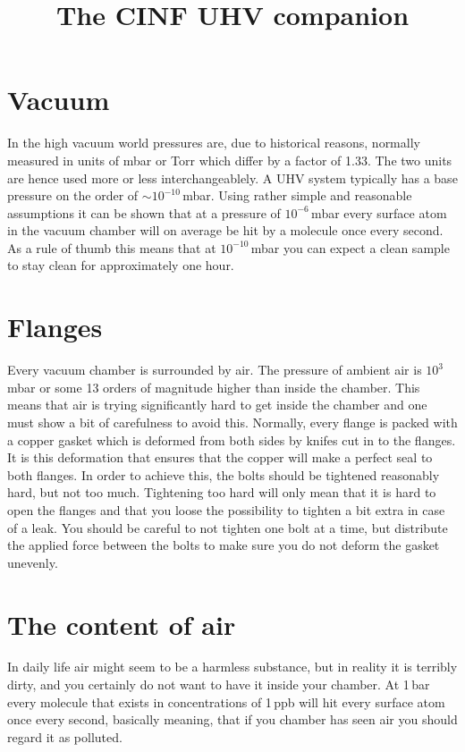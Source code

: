 \documentclass[a4paper,english]{article}
\begin{document}
\title{The CINF UHV companion}

\maketitle

\section{Vacuum}
In the high vacuum world pressures are, due to historical reasons, normally measured in units of mbar or Torr which differ by a factor of 1.33. The two units are hence used more or less interchangeablely. A UHV system typically has a base pressure on the order of $\sim 10^{-10}$\,mbar. Using rather simple and reasonable assumptions it can be shown that at a pressure of $10^{-6}$\,mbar every surface atom in the vacuum chamber will on average be hit by a molecule once every second. As a rule of thumb this means that at $10^{-10}$\,mbar you can expect a clean sample to stay clean for approximately one hour.

\section{Flanges}
Every vacuum chamber is surrounded by air. The pressure of ambient air is $10^3$\,mbar or some 13 orders of magnitude higher than inside the chamber. This means that air is trying significantly hard to get inside the chamber and one must show a bit of carefulness to avoid this. Normally, every flange is packed with a copper gasket which is deformed from both sides by knifes cut in to the flanges. It is this deformation that ensures that the copper will make a perfect seal to both flanges. In order to achieve this, the bolts should be tightened reasonably hard, but not too much. Tightening too hard will only mean that it is hard to open the flanges and that you loose the possibility to tighten a bit extra in case of a leak. You should be careful to not tighten one bolt at a time, but distribute the applied force between the bolts to make sure you do not deform the gasket unevenly.

\section{The content of air}
In daily life air might seem to be a harmless substance, but in reality it is terribly dirty, and you certainly do not want to have it inside your chamber. At 1\,bar every molecule that exists in concentrations of 1\,ppb will hit every surface atom once every second, basically meaning, that if you chamber has seen air you should regard it as polluted.
\end{document}
